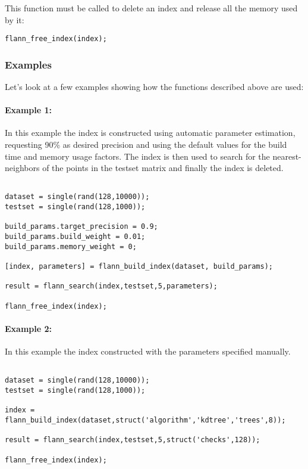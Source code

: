 \documentclass[letter,10pt]{article}
\begin{document}
This function must be called to delete an index and release all the memory
used by it:
\begin{Verbatim}
flann_free_index(index);
\end{Verbatim}

\subsubsection{Examples}

Let's look at a few examples showing how the functions described above are
used:

\paragraph{Example 1:}

In this example the index is constructed using automatic parameter estimation, requesting 90\% as desired precision and using the default values for the build time and memory usage factors. The index is then used to search for the nearest-neighbors of the points in the testset matrix and finally the index is deleted.

\begin{Verbatim}[fontsize=\footnotesize,frame=single]

dataset = single(rand(128,10000));
testset = single(rand(128,1000));

build_params.target_precision = 0.9;
build_params.build_weight = 0.01;
build_params.memory_weight = 0;

[index, parameters] = flann_build_index(dataset, build_params);

result = flann_search(index,testset,5,parameters);

flann_free_index(index);

\end{Verbatim}




% 
% 


\paragraph{Example 2:}

In this example the index constructed with the parameters specified manually.

\begin{Verbatim}[fontsize=\footnotesize,frame=single]

dataset = single(rand(128,10000));
testset = single(rand(128,1000));

index = flann_build_index(dataset,struct('algorithm','kdtree','trees',8));

result = flann_search(index,testset,5,struct('checks',128));

flann_free_index(index);

\end{Verbatim}
\end{document}
